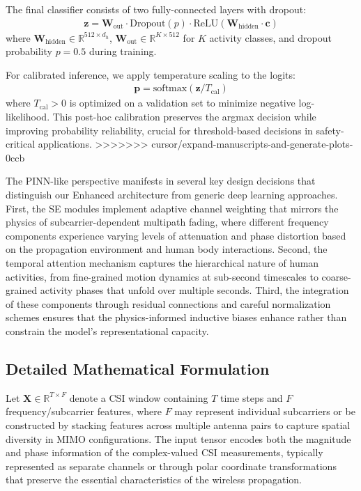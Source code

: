 \documentclass[journal]{IEEEtran}
\begin{document}
The final classifier consists of two fully-connected layers with dropout:
\begin{align}
\mathbf{z} = \mathbf{W}_{\text{out}} \cdot \mathrm{Dropout}(p) \cdot \mathrm{ReLU}(\mathbf{W}_{\text{hidden}} \cdot \mathbf{c})
\end{align}
where $\mathbf{W}_{\text{hidden}} \in \mathbb{R}^{512 \times d_h}$, $\mathbf{W}_{\text{out}} \in \mathbb{R}^{K \times 512}$ for $K$ activity classes, and dropout probability $p{=}0.5$ during training.

For calibrated inference, we apply temperature scaling to the logits:
\begin{align}
\mathbf{p} = \mathrm{softmax}(\mathbf{z}/T_{\text{cal}})
\end{align}
where $T_{\text{cal}} > 0$ is optimized on a validation set to minimize negative log-likelihood. This post-hoc calibration preserves the argmax decision while improving probability reliability, crucial for threshold-based decisions in safety-critical applications.
>>>>>>> cursor/expand-manuscripts-and-generate-plots-0ccb

The PINN-like perspective manifests in several key design decisions that distinguish our Enhanced architecture from generic deep learning approaches. First, the SE modules implement adaptive channel weighting that mirrors the physics of subcarrier-dependent multipath fading, where different frequency components experience varying levels of attenuation and phase distortion based on the propagation environment and human body interactions. Second, the temporal attention mechanism captures the hierarchical nature of human activities, from fine-grained motion dynamics at sub-second timescales to coarse-grained activity phases that unfold over multiple seconds. Third, the integration of these components through residual connections and careful normalization schemes ensures that the physics-informed inductive biases enhance rather than constrain the model's representational capacity.

\subsection{Detailed Mathematical Formulation}

Let $\mathbf{X} \in \mathbb{R}^{T \times F}$ denote a CSI window containing $T$ time steps and $F$ frequency/subcarrier features, where $F$ may represent individual subcarriers or be constructed by stacking features across multiple antenna pairs to capture spatial diversity in MIMO configurations. The input tensor encodes both the magnitude and phase information of the complex-valued CSI measurements, typically represented as separate channels or through polar coordinate transformations that preserve the essential characteristics of the wireless propagation.
\end{document}
